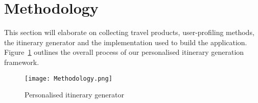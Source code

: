 \section{Methodology}

This section will elaborate on collecting travel
products, user-profiling methods, the itinerary generator and the
implementation used to build the application.
Figure~\ref{Methodology} outlines the overall process of our personalised
itinerary generation
framework. 

\begin{figure}[h]
\centering
\texttt{[image: Methodology.png]}
\caption{Personalised itinerary generator}
\label{Methodology}
\end{figure}





